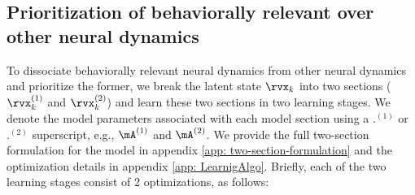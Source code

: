 \documentclass{article} %
\begin{document}
\subsection{Prioritization of behaviorally relevant over other neural dynamics}\label{sec: IPAD_dissociate_beh_rel}

To dissociate behaviorally relevant neural dynamics from other neural dynamics and prioritize the former, we break the latent state \(\rvx_{k}\) into two sections (\(\rvx_{k}^{(1)}\) and \(\rvx_{k}^{(2)}\)) and learn these two sections in two learning stages. We denote the model parameters associated with each model section using a \(.^{(1)}\) or \(.^{(2)}\) superscript, e.g., \(\mA^{(1)}\) and \(\mA^{(2)}\). We provide the full two-section formulation for the model in appendix \ref{app: two-section-formulation} and the optimization details in appendix \ref{app: LearnigAlgo}. Briefly, each of the two learning stages consist of 2 optimizations, as follows: 
\end{document}
